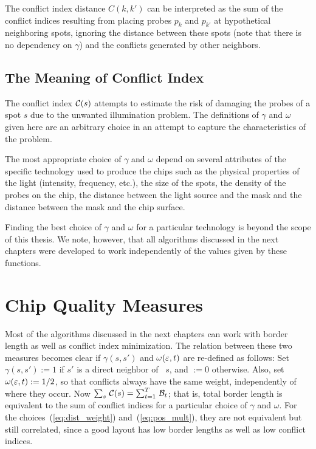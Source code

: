 The conflict index distance $C(k,k')$ can be interpreted as the sum of the
conflict indices resulting from placing probes $p_k$ and $p_{k'}$ at
hypothetical neighboring spots, ignoring the distance between these spots (note
that there is no dependency on $\gamma$) and the conflicts generated by other
neighbors.

\subsection{The Meaning of Conflict Index}

The conflict index ${\mathcal{C}}(s)$ attempts to estimate the risk of damaging the
probes of a spot $s$ due to the unwanted illumination problem. The definitions
of $\gamma$ and $\omega$ given here are an arbitrary choice in an attempt to
capture the characteristics of the problem.

The most appropriate choice of $\gamma$ and $\omega$ depend on several
attributes of the specific technology used to produce the chips such as the
physical properties of the light (intensity, frequency, etc.), the size of the
spots, the density of the probes on the chip, the distance between the light
source and the mask and the distance between the mask and the chip surface.

Finding the best choice of $\gamma$ and $\omega$ for a particular technology is
beyond the scope of this thesis. We note, however, that all algorithms discussed
in the next chapters were developed to work independently of the values given by
these functions.

\section{Chip Quality Measures}
\label{sec:mlp_bl_vs_ci}

Most of the algorithms discussed in the next chapters can work with border
length as well as conflict index minimization. The relation between these two
measures becomes clear if $\gamma(s,s')$ and $\omega(\varepsilon,t)$ are re-defined as
follows: Set $\gamma(s,s') := 1$ if $s'$ is a direct neighbor of~ $s$, and $:=0$
otherwise. Also, set $\omega(\varepsilon,t) := 1/2$, so that conflicts always have the
same weight, independently of where they occur. Now
$\sum_s\, {\mathcal{C}}(s) = \sum_{t=1}^T\, {\mathcal{B}}_t$; that is, total border length is
equivalent to the sum of conflict indices for a particular choice of $\gamma$
and $\omega$. For the choices~(\ref{eq:dist_weight}) and~(\ref{eq:pos_mult}),
they are not equivalent but still correlated, since a good layout has low border
lengths as well as low conflict indices.

